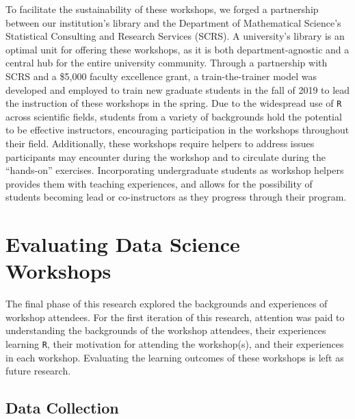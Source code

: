 \documentclass[12pt]{article}
\begin{document}
\quad To facilitate the sustainability of these workshops, we forged a partnership between our institution's library and the Department of Mathematical Science's Statistical Consulting and Research Services (SCRS). A university's library is an optimal unit for offering these workshops, as it is both department-agnostic and a central hub for the entire university community. Through a partnership with SCRS and a \$5,000 faculty excellence grant, a train-the-trainer model was developed and employed to train new graduate students in the fall of 2019 to lead the instruction of these workshops in the spring. Due to the widespread use of \texttt{R} across scientific fields, students from a variety of backgrounds hold the potential to be effective instructors,  encouraging participation in the workshops throughout their field. Additionally, these workshops require helpers to address issues participants may encounter during the workshop and to circulate during the ``hands-on'' exercises. Incorporating undergraduate students as workshop helpers provides them with teaching experiences, and allows for the possibility of students becoming lead or co-instructors as they progress through their program. 


\section{Evaluating Data Science Workshops}
\label{sec:implement}

\quad The final phase of this research explored the backgrounds and experiences of workshop attendees. For the first iteration of this research, attention was paid to understanding the backgrounds of the workshop attendees, their experiences learning \texttt{R}, their motivation for attending the workshop(s), and their experiences in each workshop. Evaluating the learning outcomes of these workshops is left as future research.  
\subsection{Data Collection}
\end{document}
